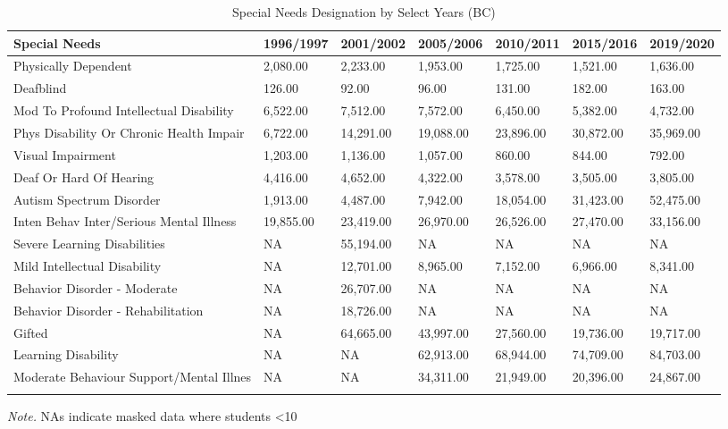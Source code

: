 \documentclass[
  english,
  man,floatsintext]{apa6}
\begin{document}
\begin{table}[tbp]

\begin{center}
\begin{threeparttable}

\caption{\label{tab:Provincial Data Table}Special Needs Designation by Select Years (BC)}

\begin{tabular}{lllllll}
\toprule
Special Needs & \multicolumn{1}{c}{1996/1997} & \multicolumn{1}{c}{2001/2002} & \multicolumn{1}{c}{2005/2006} & \multicolumn{1}{c}{2010/2011} & \multicolumn{1}{c}{2015/2016} & \multicolumn{1}{c}{2019/2020}\\
\midrule
Physically Dependent & 2,080.00 & 2,233.00 & 1,953.00 & 1,725.00 & 1,521.00 & 1,636.00\\
Deafblind & 126.00 & 92.00 & 96.00 & 131.00 & 182.00 & 163.00\\
Mod To Profound Intellectual Disability & 6,522.00 & 7,512.00 & 7,572.00 & 6,450.00 & 5,382.00 & 4,732.00\\
Phys Disability Or Chronic Health Impair & 6,722.00 & 14,291.00 & 19,088.00 & 23,896.00 & 30,872.00 & 35,969.00\\
Visual Impairment & 1,203.00 & 1,136.00 & 1,057.00 & 860.00 & 844.00 & 792.00\\
Deaf Or Hard Of Hearing & 4,416.00 & 4,652.00 & 4,322.00 & 3,578.00 & 3,505.00 & 3,805.00\\
Autism Spectrum Disorder & 1,913.00 & 4,487.00 & 7,942.00 & 18,054.00 & 31,423.00 & 52,475.00\\
Inten Behav Inter/Serious Mental Illness & 19,855.00 & 23,419.00 & 26,970.00 & 26,526.00 & 27,470.00 & 33,156.00\\
Severe Learning Disabilities & NA & 55,194.00 & NA & NA & NA & NA\\
Mild Intellectual Disability & NA & 12,701.00 & 8,965.00 & 7,152.00 & 6,966.00 & 8,341.00\\
Behavior Disorder - Moderate & NA & 26,707.00 & NA & NA & NA & NA\\
Behavior Disorder - Rehabilitation & NA & 18,726.00 & NA & NA & NA & NA\\
Gifted & NA & 64,665.00 & 43,997.00 & 27,560.00 & 19,736.00 & 19,717.00\\
Learning Disability & NA & NA & 62,913.00 & 68,944.00 & 74,709.00 & 84,703.00\\
Moderate Behaviour Support/Mental Illnes & NA & NA & 34,311.00 & 21,949.00 & 20,396.00 & 24,867.00\\
\bottomrule
\addlinespace
\end{tabular}

\begin{tablenotes}[para]
\normalsize{\textit{Note.} NAs indicate masked data where students <10}
\end{tablenotes}

\end{threeparttable}
\end{center}

\end{table}
\end{document}
